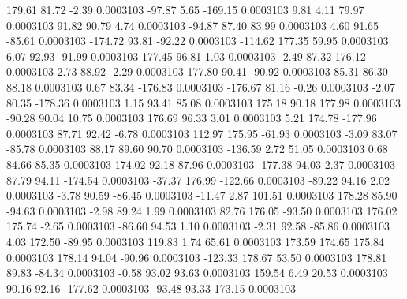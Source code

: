       179.61       81.72       -2.39     0.0003103
      -97.87        5.65     -169.15     0.0003103
        9.81        4.11       79.97     0.0003103
       91.82       90.79        4.74     0.0003103
      -94.87       87.40       83.99     0.0003103
        4.60       91.65      -85.61     0.0003103
     -174.72       93.81      -92.22     0.0003103
     -114.62      177.35       59.95     0.0003103
        6.07       92.93      -91.99     0.0003103
      177.45       96.81        1.03     0.0003103
       -2.49       87.32      176.12     0.0003103
        2.73       88.92       -2.29     0.0003103
      177.80       90.41      -90.92     0.0003103
       85.31       86.30       88.18     0.0003103
        0.67       83.34     -176.83     0.0003103
     -176.67       81.16       -0.26     0.0003103
       -2.07       80.35     -178.36     0.0003103
        1.15       93.41       85.08     0.0003103
      175.18       90.18      177.98     0.0003103
      -90.28       90.04       10.75     0.0003103
      176.69       96.33        3.01     0.0003103
        5.21      174.78     -177.96     0.0003103
       87.71       92.42       -6.78     0.0003103
      112.97      175.95      -61.93     0.0003103
       -3.09       83.07      -85.78     0.0003103
       88.17       89.60       90.70     0.0003103
     -136.59        2.72       51.05     0.0003103
        0.68       84.66       85.35     0.0003103
      174.02       92.18       87.96     0.0003103
     -177.38       94.03        2.37     0.0003103
       87.79       94.11     -174.54     0.0003103
      -37.37      176.99     -122.66     0.0003103
      -89.22       94.16        2.02     0.0003103
       -3.78       90.59      -86.45     0.0003103
      -11.47        2.87      101.51     0.0003103
      178.28       85.90      -94.63     0.0003103
       -2.98       89.24        1.99     0.0003103
       82.76      176.05      -93.50     0.0003103
      176.02      175.74       -2.65     0.0003103
      -86.60       94.53        1.10     0.0003103
       -2.31       92.58      -85.86     0.0003103
        4.03      172.50      -89.95     0.0003103
      119.83        1.74       65.61     0.0003103
      173.59      174.65      175.84     0.0003103
      178.14       94.04      -90.96     0.0003103
     -123.33      178.67       53.50     0.0003103
      178.81       89.83      -84.34     0.0003103
       -0.58       93.02       93.63     0.0003103
      159.54        6.49       20.53     0.0003103
       90.16       92.16     -177.62     0.0003103
      -93.48       93.33      173.15     0.0003103
